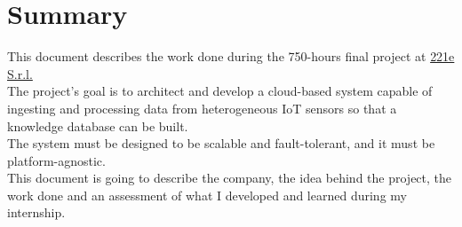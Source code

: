 \cleardoublepage
{}
{}
\begingroup
\let\clearpage\relax
\let\cleardoublepage\relax
\let\cleardoublepage\relax

\chapter*{Summary}

This document describes the work done during the 750-hours final project at \href{https://www.221e.com/about-us}{221e S.r.l.}\\
The project's goal is to architect and develop a cloud-based system capable of ingesting and processing data from heterogeneous IoT sensors so that a knowledge database can be built.\\
The system must be designed to be scalable and fault-tolerant, and it must be platform-agnostic.\\
This document is going to describe the company, the idea behind the project, the work done and an assessment of what I developed and learned during my internship.\\




\endgroup

\vfill
